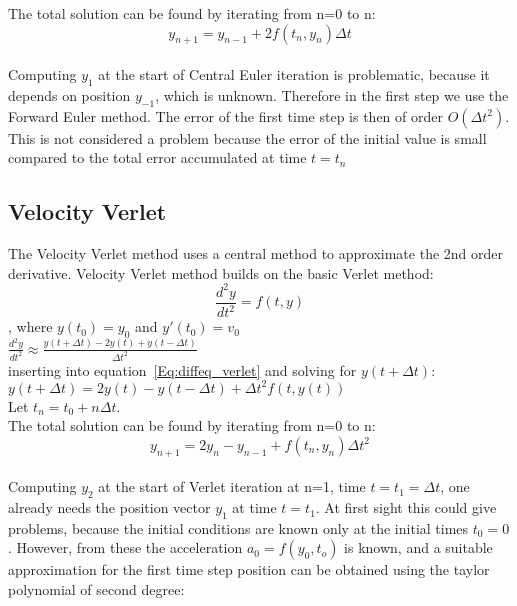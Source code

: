 The total solution can be found by iterating from n=0 to n:\\
\begin{equation}
y_{n+1} = y_{n-1}+2f(t_n, y_n)\Delta t
\label{Eq:Central_Euler}
\end{equation}\\

Computing $y_1$ at the start of Central Euler iteration is problematic, because it depends on position $y_{-1}$, which is unknown. Therefore in the first step we use the Forward Euler method. The error of the first time step is then of order $O(\Delta t^2)$. This is not considered a problem because the error of the initial value is small compared to the total error accumulated at time $t=t_n$

\subsection{Velocity Verlet}
The Velocity Verlet method uses a central method to approximate the 2nd order derivative. Velocity Verlet method builds on the basic Verlet method:\\

\begin{equation}
\frac{d^2y}{dt^2}=f(t,y)
\label{Eq:diffeq_verlet}
\end{equation}
, where $y(t_0)=y_0$ and $y'(t_0) = v_0$\\



$\frac{d^2y}{dt^2} \approx \frac{y(t+\Delta t) -2y(t)+y(t-\Delta t)}{\Delta t^2}$\\

inserting into equation~\ref{Eq:diffeq_verlet} and solving for $y(t+\Delta t)$:\\

$y(t+\Delta t) = 2y(t)-y(t-\Delta t)+\Delta t^2 f(t,y(t))$\\


Let $t_n = t_0+n\Delta t$.\\

The total solution can be found by iterating from n=0 to n:\\
\begin{equation}
y_{n+1} = 2y_n - y_{n-1} + f(t_n, y_n)\Delta t^2
\label{Eq:Verlet}
\end{equation}\\

Computing $y_2$ at the start of Verlet iteration at n=1, time $t=t_1=\Delta t$, one already needs the position vector $y_1$ at time $t=t_1$. At first sight this could give problems, because the initial conditions are known only at the initial times $t_0 = 0$. However, from these the acceleration $a_0 = f(y_0, t_o)$ is known, and a suitable approximation for the first time step position can be obtained using the taylor polynomial of second degree:\\

